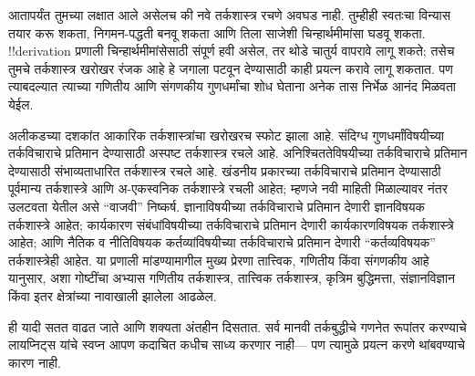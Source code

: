 \documentclass[../../../include/open-logic-section]{subfiles}
\begin{document}


आतापर्यंत तुमच्या लक्षात आले असेलच की नवे तर्कशास्त्र रचणे अवघड नाही. तुम्हीही
स्वतःचा विन्यास तयार करू शकता, निगमन-पद्धती बनवू शकता आणि तिला साजेशी
चिन्हार्थमीमांसा घडवू शकता. !!{derivation} प्रणाली चिन्हार्थमीमांसेसाठी
संपूर्ण हवी असेल, तर थोडे चातुर्य वापरावे लागू शकते; तसेच तुमचे तर्कशास्त्र
खरोखर रंजक आहे हे जगाला पटवून देण्यासाठी काही प्रयत्न करावे लागू शकतात. पण
त्याबदल्यात त्याच्या गणितीय आणि संगणकीय गुणधर्मांचा शोध घेताना अनेक तास
निर्भेळ आनंद मिळवता येईल.

अलीकडच्या दशकांत आकारिक तर्कशास्त्रांचा खरोखरच स्फोट झाला आहे. संदिग्ध
गुणधर्मांविषयीच्या तर्कविचाराचे प्रतिमान देण्यासाठी अस्पष्ट तर्कशास्त्र रचले
आहे. अनिश्चिततेविषयीच्या तर्कविचाराचे प्रतिमान देण्यासाठी संभाव्यताधारित
तर्कशास्त्र रचले आहे. खंडनीय प्रकारच्या तर्कविचाराचे प्रतिमान देण्यासाठी
पूर्वमान्य तर्कशास्त्रे आणि अ-एकस्वनिक तर्कशास्त्रे रचली आहेत; म्हणजे नवी
माहिती मिळाल्यावर नंतर उलटवता येतील असे “वाजवी” निष्कर्ष. ज्ञानाविषयीच्या
तर्कविचाराचे प्रतिमान देणारी ज्ञानविषयक तर्कशास्त्रे आहेत; कार्यकारण
संबंधांविषयीच्या तर्कविचाराचे प्रतिमान देणारी कार्यकारणविषयक तर्कशास्त्रे
आहेत; आणि नैतिक व नीतिविषयक कर्तव्यांविषयीच्या तर्कविचाराचे प्रतिमान देणारी
“कर्तव्यविषयक” तर्कशास्त्रेही आहेत. या प्रणाली मांडण्यामागील मुख्य प्रेरणा
तात्त्विक, गणितीय किंवा संगणकीय आहे यानुसार, अशा गोष्टींचा अभ्यास गणितीय
तर्कशास्त्र, तात्त्विक तर्कशास्त्र, कृत्रिम बुद्धिमत्ता, संज्ञानविज्ञान किंवा
इतर क्षेत्रांच्या नावाखाली झालेला आढळेल.

ही यादी सतत वाढत जाते आणि शक्यता अंतहीन दिसतात. सर्व मानवी तर्कबुद्धीचे गणनेत
रूपांतर करण्याचे लायप्निट्स यांचे स्वप्न आपण कदाचित कधीच साध्य करणार नाही---
पण त्यामुळे प्रयत्न करणे थांबवण्याचे कारण नाही.
\end{document}
